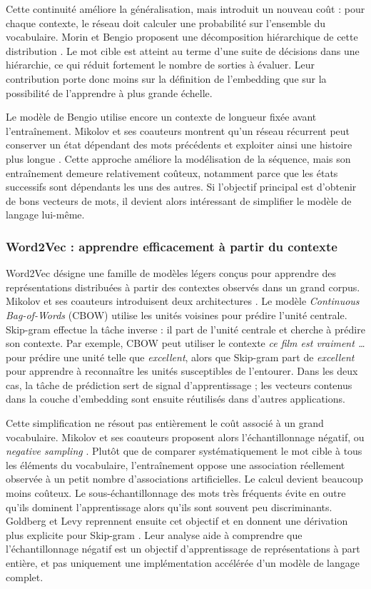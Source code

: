 Cette continuité améliore la généralisation, mais introduit un nouveau coût :
pour chaque contexte, le réseau doit calculer une probabilité sur l'ensemble du
vocabulaire. Morin et Bengio proposent une
décomposition hiérarchique de cette distribution
\cite{morin2005hierarchical}. Le mot cible est atteint au terme d'une suite de
décisions dans une hiérarchie, ce qui réduit fortement le nombre de sorties à
évaluer. Leur contribution porte donc moins sur la définition de l'embedding
que sur la possibilité de l'apprendre à plus grande échelle.

Le modèle de Bengio utilise encore un contexte de longueur fixée avant
l'entraînement. Mikolov et ses coauteurs montrent qu'un réseau récurrent peut
conserver un état dépendant des mots précédents et exploiter ainsi une histoire
plus longue \cite{mikolov2010rnn}. Cette approche améliore la modélisation de la
séquence, mais son entraînement demeure relativement coûteux, notamment parce
que les états successifs sont dépendants les uns des autres. Si l'objectif
principal est d'obtenir de bons vecteurs de mots, il devient alors intéressant
de simplifier le modèle de langage lui-même.

\subsubsection{Word2Vec : apprendre efficacement à partir du contexte}

Word2Vec désigne une famille de modèles légers conçus pour apprendre des
représentations distribuées à partir des contextes observés dans un grand
corpus. Mikolov et ses coauteurs introduisent deux architectures
\cite{mikolov2013efficient}. Le modèle \emph{Continuous Bag-of-Words} (CBOW)
utilise les unités voisines pour prédire l'unité centrale. Skip-gram effectue la
tâche inverse : il part de l'unité centrale et cherche à prédire son contexte.
Par exemple, CBOW peut utiliser le contexte \emph{ce film est vraiment …} pour
prédire une unité telle que \emph{excellent}, alors que Skip-gram part de
\emph{excellent} pour apprendre à reconnaître les unités susceptibles de
l'entourer. Dans les deux cas, la tâche de prédiction sert de signal
d'apprentissage ; les vecteurs contenus dans la couche d'embedding sont ensuite
réutilisés dans d'autres applications.

Cette simplification ne résout pas entièrement le coût associé à un grand
vocabulaire. Mikolov et ses coauteurs proposent alors l'échantillonnage négatif,
ou \emph{negative sampling} \cite{mikolov2013distributed}. Plutôt que de
comparer systématiquement le mot cible à tous les éléments du vocabulaire,
l'entraînement oppose une association réellement observée à un petit nombre
d'associations artificielles. Le calcul devient beaucoup moins coûteux. Le
sous-échantillonnage des mots très fréquents évite en outre qu'ils dominent
l'apprentissage alors qu'ils sont souvent peu discriminants. Goldberg et Levy
reprennent ensuite cet objectif et en donnent une dérivation plus explicite
pour Skip-gram \cite{goldberg2014word2vec}. Leur analyse aide à comprendre que
l'échantillonnage négatif est un objectif d'apprentissage de représentations à
part entière, et pas uniquement une implémentation accélérée d'un modèle de
langage complet.

